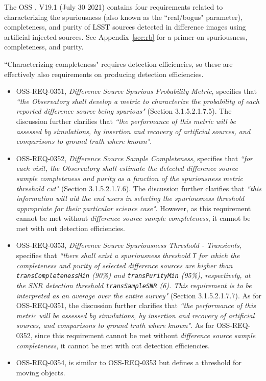 The OSS , V19.1 (July 30 2021) contains four requirements related to characterizing the spuriousness (also known as the ``real/bogus" parameter), completeness, and purity of LSST sources detected in difference images using artificial injected sources. 
See Appendix~\ref{sec:rb} for a primer on spuriousness, completeness, and purity.

``Characterizing completeness" requires detection efficiencies, so these are effectively also requirements on producing detection efficiencies. 

\begin{itemize}

\item OSS-REQ-0351, {\it Difference Source Spurious Probability Metric}, specifies that {\it ``the Observatory shall develop a metric to characterize the probability of each reported difference source being spurious"} (Section 3.1.5.2.1.7.5).
The discussion further clarifies that {\it ``the performance of this metric will be assessed by simulations, by insertion and recovery of artificial sources, and comparisons to ground truth where known"}.

\item OSS-REQ-0352, {\it Difference Source Sample Completeness}, specifies that {\it ``for each visit, the Observatory shall estimate the detected difference source sample completeness and purity as a function of the spuriousness metric threshold cut"} (Section 3.1.5.2.1.7.6).
The discussion further clarifies that {\it ``this information will aid the end
users in selecting the spuriousness threshold appropriate for their particular science case"}.
However, as this requirement cannot be met without {\it difference source sample completeness}, it cannot be met with out detection efficiencies.

\item OSS-REQ-0353, {\it Difference Source Spuriousness Threshold - Transients}, specifies that {\it ``there shall exist a spuriousness threshold {\tt T} for which the completeness and purity of selected difference sources are higher than {\tt transCompletenessMin} (90\%) and {\tt transPurityMin} (95\%), respectively, at the SNR detection threshold {\tt transSampleSNR} (6). This requirement is to be interpreted as an average over the entire survey"} (Section 3.1.5.2.1.7.7).
As for OSS-REQ-0351, the discussion further clarifies that {\it ``the performance of this metric will be assessed by simulations, by insertion and recovery of artificial sources, and comparisons to ground truth where known"}.
As for OSS-REQ-0352, since this requirement cannot be met without {\it difference source sample completeness}, it cannot be met with out detection efficiencies.

\item OSS-REQ-0354, is similar to OSS-REQ-0353 but defines a threshold for moving objects.

\end{itemize}

